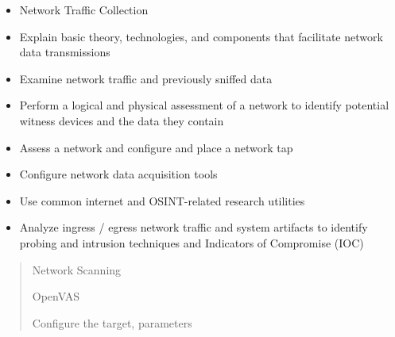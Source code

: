 \begin{itemize}

        \item Network Traffic Collection
            \item Explain basic theory, technologies, and components that facilitate network data transmissions
            \item Examine network traffic and previously sniffed data
            \item Perform a logical and physical assessment of a network to identify potential witness devices and the data they contain
            \item Assess a network and configure  and place a network tap
            \item Configure network data acquisition tools
            \item Use common internet and OSINT-related research utilities
            \item Analyze ingress / egress network traffic and system artifacts to identify probing and intrusion techniques and Indicators of Compromise (IOC)
    \end{itemize}

\begin{abstract}
        \item Network Scanning
            \item OpenVAS
                \item Configure the target, parameters 
\end{abstract}
  









